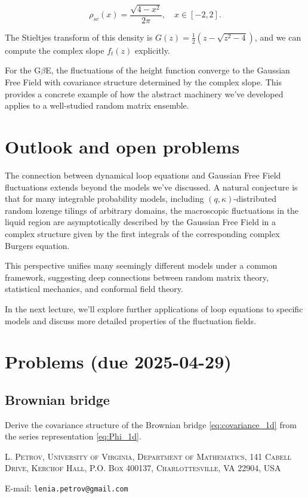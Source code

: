 \documentclass[letterpaper,11pt,oneside,reqno]{article}
\numberwithin{equation}{section}
\theoremstyle{definition}
\begin{document}
$$\rho_{sc}(x) = \frac{\sqrt{4-x^2}}{2\pi}, \quad x \in [-2, 2].$$

The Stieltjes transform of this density is $G(z) = \frac{1}{2}(z - \sqrt{z^2-4})$, and we can compute the complex slope $f_t(z)$ explicitly.

For the G$\beta$E, the fluctuations of the height function converge to the Gaussian Free Field with covariance structure determined by the complex slope. This provides a concrete example of how the abstract machinery we've developed applies to a well-studied random matrix ensemble.

\section{Outlook and open problems}

The connection between dynamical loop equations and Gaussian Free Field fluctuations extends beyond the models we've discussed. A natural conjecture is that for many integrable probability models, including $(q,\kappa)$-distributed random lozenge tilings of arbitrary domains, the macroscopic fluctuations in the liquid region are asymptotically described by the Gaussian Free Field in a complex structure given by the first integrals of the corresponding complex Burgers equation.

This perspective unifies many seemingly different models under a common framework, suggesting deep connections between random matrix theory, statistical mechanics, and conformal field theory.

In the next lecture, we'll explore further applications of loop equations to specific models and discuss more detailed properties of the fluctuation fields.



\appendix
\setcounter{section}{8}

\section{Problems (due 2025-04-29)}

\subsection{Brownian bridge}

Derive the covariance structure of the Brownian bridge
\eqref{eq:covariance_1d} from the series representation
\eqref{eq:Phi_1d}.







\medskip

\textsc{L. Petrov, University of Virginia, Department of Mathematics, 141 Cabell Drive, Kerchof Hall, P.O. Box 400137, Charlottesville, VA 22904, USA}

E-mail: \texttt{lenia.petrov@gmail.com}
\end{document}
